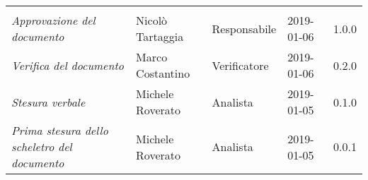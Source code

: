 \newpage 
\section*{}
\begin{table}[H]
	\centering
	\begin{tabular}{p{4cm}|C{3cm}|C{3cm}|R{2.5cm}|R{2cm}}
		
		 & & & & \\
		
		
		\emph{Approvazione del documento} &  Nicolò Tartaggia & Responsabile & 2019-01-06 & 1.0.0 \\
		\hline
		
		\emph{Verifica del documento} & Marco Costantino & Verificatore & 2019-01-06 & 0.2.0 \\
		\hline

		\emph{Stesura verbale} & Michele Roverato & Analista & 2019-01-05 & 0.1.0 \\
		\hline
		
		\emph{Prima stesura dello scheletro del documento} & Michele Roverato & Analista & 2019-01-05 & 0.0.1 \\
		
	\end{tabular}
	
\end{table}


\clearpage